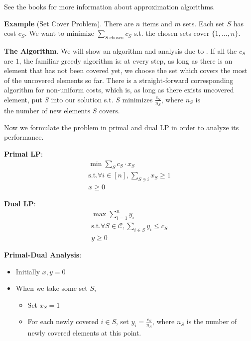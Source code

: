 \documentclass[11pt]{article}
\begin{document}
See the books \cite{WilliamsonShmoys,vazirani2001approximation} for more information about approximation algorithms. 

\textbf{Example} (Set Cover Problem). There are $n$ items and $m$ sets. Each set $S$ has cost $c_S$. We want to minimize $\sum_{S\text{ chosen}}{c_S}$ s.t. the chosen sets cover $\{1,\ldots,n\}$.

\textbf{The Algorithm}. We will show an algorithm and analysis due to \cite{Chvatal79,Lovasz75}. If all the $c_S$ are $1$,  the familiar greedy algorithm is: at every step, as long as there is an element that has not been covered yet, we choose the set which covers the most of the uncovered elements so far. There is a straight-forward corresponding algorithm for non-uniform costs, which is, as long as there exists uncovered element, put $S$ into our solution s.t. $S$ minimizes $\frac{c_S}{n_S}$, where $n_S$ is $\text{the number of new elements } S \text{ covers}$.

Now we formulate the problem in primal and dual LP in order to analyze its performance. 

\textbf{Primal LP}:
\begin{equation}
\begin{split}
\min \sum_{S}{c_S\cdot x_S} \\
\text{s.t.} \forall i\in [n], \sum_{S\ni i}{x_S}\ge 1 \\
x\ge 0
\end{split}
\end{equation}

\textbf{Dual LP}:
\begin{equation}
\begin{split}
\max \sum_{i=1}^{n}{y_i} \\
\text{s.t.} \forall S\in \mathcal{C}, \sum_{i\in S}{y_i} \le c_S \\
y\ge 0
\end{split}
\end{equation}


\textbf{Primal-Dual Analysis}:

\begin{itemize}
\item Initially $x,y=0$
\item When we take some set $S$, 
\begin{itemize} 
\item Set $x_S=1$
\item For each newly covered $i\in S$, set $y_i = \frac{c_S}{n_S}$, where $n_S$ is the number of newly covered elements at this point. 
\end{itemize}
\end{itemize}
\end{document}
